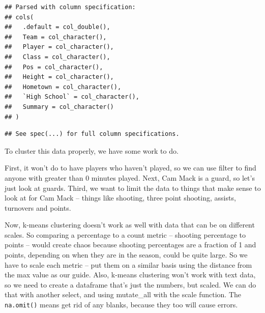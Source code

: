 \documentclass[
]{book}
\newenvironment{Shaded}{\begin{snugshade}}{\end{snugshade}}
\newcommand{\DataTypeTok}[1]{\textcolor[rgb]{0.13,0.29,0.53}{#1}}
\newcommand{\DecValTok}[1]{\textcolor[rgb]{0.00,0.00,0.81}{#1}}
\newcommand{\KeywordTok}[1]{\textcolor[rgb]{0.13,0.29,0.53}{\textbf{#1}}}
\newcommand{\NormalTok}[1]{#1}
\newcommand{\OperatorTok}[1]{\textcolor[rgb]{0.81,0.36,0.00}{\textbf{#1}}}
\newcommand{\StringTok}[1]{\textcolor[rgb]{0.31,0.60,0.02}{#1}}
\begin{document}
\begin{verbatim}
## Parsed with column specification:
## cols(
##   .default = col_double(),
##   Team = col_character(),
##   Player = col_character(),
##   Class = col_character(),
##   Pos = col_character(),
##   Height = col_character(),
##   Hometown = col_character(),
##   `High School` = col_character(),
##   Summary = col_character()
## )
\end{verbatim}

\begin{verbatim}
## See spec(...) for full column specifications.
\end{verbatim}

To cluster this data properly, we have some work to do.

First, it won't do to have players who haven't played, so we can use filter to find anyone with greater than 0 minutes played. Next, Cam Mack is a guard, so let's just look at guards. Third, we want to limit the data to things that make sense to look at for Cam Mack -- things like shooting, three point shooting, assists, turnovers and points.

\begin{Shaded}
\end{Shaded}

Now, k-means clustering doesn't work as well with data that can be on different scales. So comparing a percentage to a count metric -- shooting percentage to points -- would create chaos because shooting percentages are a fraction of 1 and points, depending on when they are in the season, could be quite large. So we have to scale each metric -- put them on a similar basis using the distance from the max value as our guide. Also, k-means clustering won't work with text data, so we need to create a dataframe that's just the numbers, but scaled. We can do that with another select, and using mutate\_all with the scale function. The \texttt{na.omit()} means get rid of any blanks, because they too will cause errors.
\end{document}
